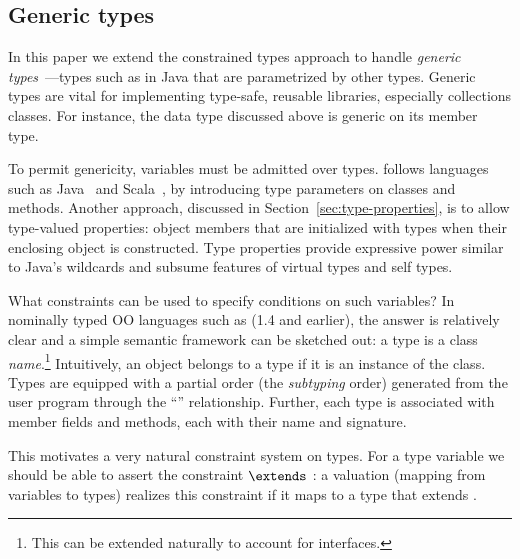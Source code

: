 \subsection{Generic types}

In this paper we extend the constrained types approach to handle
\emph{generic
types}~\cite{clu,ada,GJ,java-popl97,thorup97,Java3,csharp-generics}---types
such as  in Java that are parametrized by other
types. Generic types are vital for implementing type-safe, reusable
libraries, especially collections classes. For instance, the data type
 discussed above is generic on its member type.

To permit genericity, variables  must be admitted over types.
\Xten{} follows languages such as Java~\cite{Java3} and
Scala~\cite{scala}, by introducing type parameters on classes
and methods.
Another approach, discussed in
Section~\ref{sec:type-properties}, is to 
allow type-valued properties: object members that are
initialized with types when their enclosing object is
constructed.  Type properties provide expressive power
similar to Java's wildcards and subsume features of 
virtual types and self types.

What constraints can be used to specify conditions on such variables?
In nominally typed OO languages such as \Java (1.4 and earlier), the answer is
relatively clear and a simple semantic framework can be sketched out:
a type is a class \emph{name}.\footnote{This can be extended naturally
to account for interfaces.} Intuitively, an object belongs to a type
if it is an instance of the class. Types are equipped with a partial
order (the \emph{subtyping} order) generated from the user program
through the ``'' relationship.  Further, each type is
associated with member fields and methods, each with their
name and signature.
%

This motivates a very natural constraint system on types.  For a type
variable  we should be able to assert the constraint 
$\extends$ : a valuation (mapping from variables to types) realizes
this constraint if it maps  to a type that extends .

